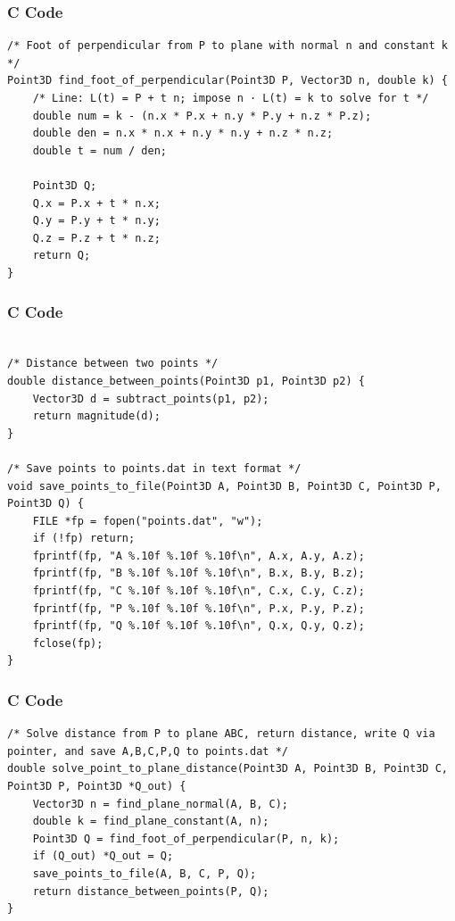 \documentclass{beamer}
\begin{document}
\begin{frame}[fragile]
    \frametitle{C Code}
    \begin{lstlisting}
/* Foot of perpendicular from P to plane with normal n and constant k */
Point3D find_foot_of_perpendicular(Point3D P, Vector3D n, double k) {
    /* Line: L(t) = P + t n; impose n · L(t) = k to solve for t */
    double num = k - (n.x * P.x + n.y * P.y + n.z * P.z);
    double den = n.x * n.x + n.y * n.y + n.z * n.z;
    double t = num / den;

    Point3D Q;
    Q.x = P.x + t * n.x;
    Q.y = P.y + t * n.y;
    Q.z = P.z + t * n.z;
    return Q;
}

    \end{lstlisting}
\end{frame}

\begin{frame}[fragile]
    \frametitle{C Code}
    \begin{lstlisting}

/* Distance between two points */
double distance_between_points(Point3D p1, Point3D p2) {
    Vector3D d = subtract_points(p1, p2);
    return magnitude(d);
}

/* Save points to points.dat in text format */
void save_points_to_file(Point3D A, Point3D B, Point3D C, Point3D P, Point3D Q) {
    FILE *fp = fopen("points.dat", "w");
    if (!fp) return;
    fprintf(fp, "A %.10f %.10f %.10f\n", A.x, A.y, A.z);
    fprintf(fp, "B %.10f %.10f %.10f\n", B.x, B.y, B.z);
    fprintf(fp, "C %.10f %.10f %.10f\n", C.x, C.y, C.z);
    fprintf(fp, "P %.10f %.10f %.10f\n", P.x, P.y, P.z);
    fprintf(fp, "Q %.10f %.10f %.10f\n", Q.x, Q.y, Q.z);
    fclose(fp);
}
    \end{lstlisting}
\end{frame}

\begin{frame}[fragile]
    \frametitle{C Code}
    \begin{lstlisting}
/* Solve distance from P to plane ABC, return distance, write Q via pointer, and save A,B,C,P,Q to points.dat */
double solve_point_to_plane_distance(Point3D A, Point3D B, Point3D C, Point3D P, Point3D *Q_out) {
    Vector3D n = find_plane_normal(A, B, C);
    double k = find_plane_constant(A, n);
    Point3D Q = find_foot_of_perpendicular(P, n, k);
    if (Q_out) *Q_out = Q;
    save_points_to_file(A, B, C, P, Q);
    return distance_between_points(P, Q);
}
    \end{lstlisting}
\end{frame}
\end{document}
